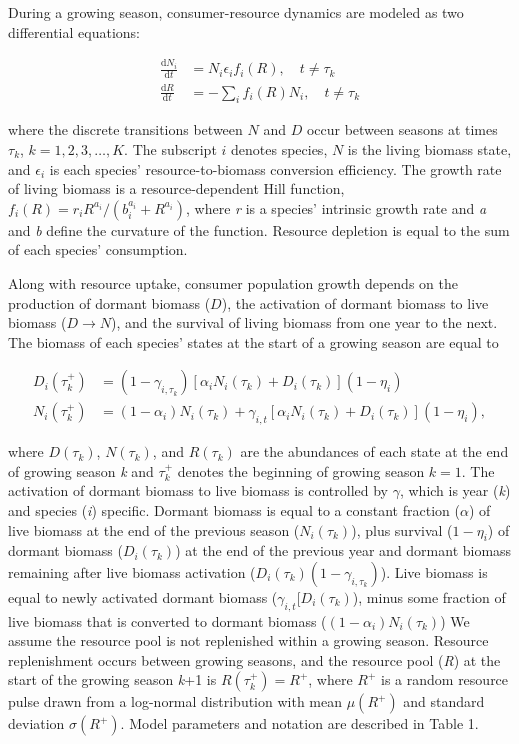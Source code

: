 \documentclass[12pt,]{article}
\begin{document}
During a growing season, consumer-resource dynamics are modeled as two
differential equations:

\begin{align}
\frac{\text{d}N_{i}}{\text{d}t} &= N_{i}\epsilon_if_{i}(R), \quad t \ne \tau_k\\
\frac{\text{d}R}{\text{d}t} &= - \sum\limits_{i}f_{i}(R)N_{i}, \quad t \ne \tau_k
\end{align}

\noindent where the discrete transitions between \(N\) and \(D\) occur
between seasons at times \(\tau_k\), \(k = 1,2,3, \dots, K\). The
subscript \(i\) denotes species, \(N\) is the living biomass state, and
\(\epsilon_i\) is each species' resource-to-biomass conversion
efficiency. The growth rate of living biomass is a resource-dependent
Hill function,
\(f_{i}(R) = r_{i}R^{a_{i}} / (b_{i}^{a_{i}}+R^{a_{i}})\), where
\emph{r} is a species' intrinsic growth rate and \emph{a} and \emph{b}
define the curvature of the function. Resource depletion is equal to the
sum of each species' consumption.

Along with resource uptake, consumer population growth depends on the
production of dormant biomass (\(D\)), the activation of dormant biomass
to live biomass (\(D \rightarrow N\)), and the survival of living
biomass from one year to the next. The biomass of each species' states
at the start of a growing season are equal to

\begin{align}
  D_{i}(\tau_k^+) &= (1-\gamma_{i,\tau_k})[\alpha_i N_{i}(\tau_k) + D_{i}(\tau_k)](1-\eta_i) \\
  N_{i}(\tau_k^+) &= (1-\alpha_i)N_{i}(\tau_k) + \gamma_{i,t}[\alpha_i N_{i}(\tau_k) + D_{i}(\tau_k)] (1-\eta_i),
\end{align}

\noindent where \(D(\tau_k)\), \(N(\tau_k)\), and \(R(\tau_k)\) are the
abundances of each state at the end of growing season \emph{k} and
\(\tau_k^+\) denotes the beginning of growing season \(k=1\). The
activation of dormant biomass to live biomass is controlled by
\(\gamma\), which is year (\emph{k}) and species (\emph{i}) specific.
Dormant biomass is equal to a constant fraction (\(\alpha\)) of live
biomass at the end of the previous season (\(N_{i}(\tau_k)\)), plus
survival (\(1-\eta_i\)) of dormant biomass (\(D_{i}(\tau_k)\)) at the
end of the previous year and dormant biomass remaining after live
biomass activation (\(D_{i}(\tau_k)(1-\gamma_{i,\tau_k})\)). Live
biomass is equal to newly activated dormant biomass
(\(\gamma_{i,t}[D_{i}(\tau_k)\)), minus some fraction of live biomass
that is converted to dormant biomass (\((1-\alpha_i)N_{i}(\tau_k)\)) We
assume the resource pool is not replenished within a growing season.
Resource replenishment occurs between growing seasons, and the resource
pool (\emph{R}) at the start of the growing season \emph{k}+1 is
\(R(\tau_k^+) = R^+\), where \(R^+\) is a random resource pulse drawn
from a log-normal distribution with mean \(\mu(R^+)\) and standard
deviation \(\sigma(R^+)\). Model parameters and notation are described
in Table 1.
\end{document}
